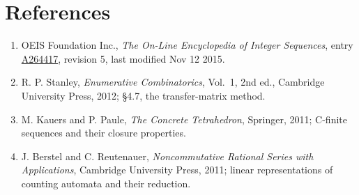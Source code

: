 \documentclass[11pt]{article}
\theoremstyle{definition}
\begin{document}
\section{References}

\begin{enumerate}

\item OEIS Foundation Inc., \emph{The On-Line Encyclopedia of Integer Sequences}, entry \href{https://oeis.org/A264417}{A264417}, revision 5, last modified Nov 12 2015.

\item R. P. Stanley, \emph{Enumerative Combinatorics}, Vol.~1, 2nd ed., Cambridge University Press, 2012; \S4.7, the transfer-matrix method.

\item M. Kauers and P. Paule, \emph{The Concrete Tetrahedron}, Springer, 2011; C-finite sequences and their closure properties.

\item J. Berstel and C. Reutenauer, \emph{Noncommutative Rational Series with Applications}, Cambridge University Press, 2011; linear representations of counting automata and their reduction.

\end{enumerate}
\end{document}
